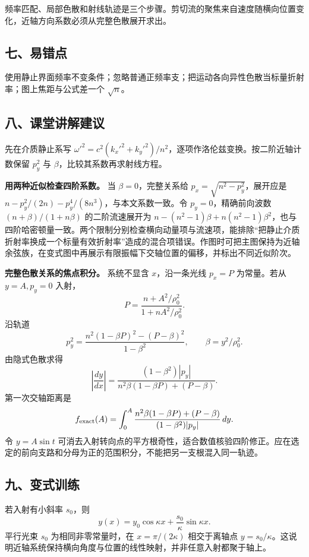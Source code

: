\documentclass[12pt,a4paper,UTF8]{ctexart}
\begin{document}
频率匹配、局部色散和射线轨迹是三个步骤。剪切流的聚焦来自速度随横向位置变化，近轴方向系数必须从完整色散展开求出。

\subsection{七、易错点}\label{ux4e03ux6613ux9519ux70b9-7}

使用静止界面频率不变条件；忽略普通正频率支；把运动各向异性色散当标量折射率；图上焦距与公式差一个
\(\sqrt n\)。

\subsection{八、课堂讲解建议}\label{ux516bux8bfeux5802ux8bb2ux89e3ux5efaux8bae-7}

先在介质静止系写
\(\omega'^2=c^2(k_x'^2+k_y'^2)/n^2\)，逐项作洛伦兹变换。按二阶近轴计数保留
\(p_y^2\) 与 \(\beta\)，比较其系数再求射线方程。

\textbf{用两种近似检查四阶系数。} 当 \(\beta=0\)，完整关系给
\(p_x=\sqrt{n^2-p_y^2}\)，展开应是
\(n-p_y^2/(2n)-p_y^4/(8n^3)\)，与本文系数一致。令
\(p_y=0\)，精确前向波数 \((n+\beta)/(1+n\beta)\) 的二阶流速展开为
\(n-(n^2-1)\beta+n(n^2-1)\beta^2\)，也与四阶哈密顿量一致。两个限制分别检查横向动量项与流速项，能排除``把静止介质折射率换成一个标量有效折射率''造成的混合项错误。作图时可把主图保持为近轴余弦族，在变式图中再展示有限振幅下交轴位置的偏移，并标出不同近似阶次。

\textbf{完整色散关系的焦点积分。} 系统不显含 \(x\)，沿一条光线 \(p_x=P\)
为常量。若从 \(y=A,p_y=0\) 入射， \[
P=\frac{n+A^2/\rho_0^2}{1+nA^2/\rho_0^2}.
\] 沿轨道 \[
p_y^2=
\frac{n^2(1-\beta P)^2-(P-\beta)^2}{1-\beta^2},
\qquad \beta=y^2/\rho_0^2.
\] 由隐式色散求得 \[
\left|\frac{dy}{dx}\right|=
\frac{(1-\beta^2)|p_y|}
{n^2\beta(1-\beta P)+(P-\beta)}.
\] 第一次交轴距离是 \[
f_{\rm exact}(A)=\int_0^A
\frac{n^2\beta(1-\beta P)+(P-\beta)}
{(1-\beta^2)|p_y|}\,dy.
\] 令 \(y=A\sin t\)
可消去入射转向点的平方根奇性，适合数值核验四阶修正。应在选定的前向支路和分母为正的范围积分，不能把另一支根混入同一轨迹。

\subsection{九、变式训练}\label{ux4e5dux53d8ux5f0fux8badux7ec3-7}

若入射有小斜率 \(s_0\)，则 \[
y(x)=y_0\cos\kappa x+\frac{s_0}{\kappa}\sin\kappa x.
\] 平行光束 \(s_0\) 为相同非零常量时，在 \(x=\pi/(2\kappa)\)
相交于离轴点
\(y=s_0/\kappa\)。这说明近轴系统保持横向角度与位置的线性映射，并非任意入射都聚于轴上。
\end{document}
